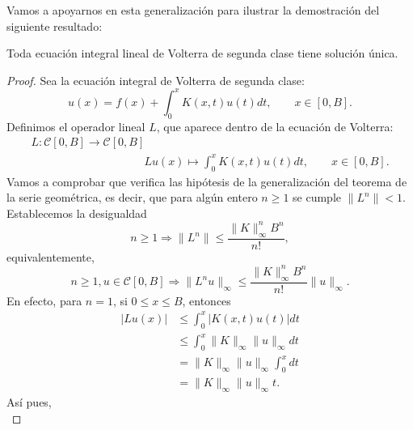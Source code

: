 Vamos a apoyarnos en esta generalización para ilustrar la demostración del siguiente resultado:
\begin{corolario}
	Toda ecuación integral lineal de Volterra de segunda clase tiene solución única.
\end{corolario}
\begin{proof}
	Sea la ecuación integral de Volterra de segunda clase:
	\begin{equation}
		u(x) = f(x) + \int_0^x K(x,t)u(t)dt, \qquad x \in [0,B].
	\end{equation}
	Definimos el operador lineal $L$, que aparece dentro de la ecuación de Volterra:
	\begin{equation}
		\begin{array}{c}
		L: \mathcal{C}[0,B] \rightarrow \mathcal{C}[0,B] \\
		\qquad \qquad \qquad \qquad \qquad Lu(x) \mapsto \displaystyle \int_{0}^{x} K(x,t)u(t)dt, \qquad x \in [0,B].
		\end{array}
	\end{equation}
	Vamos a comprobar que verifica las hipótesis de la generalización del teorema de la serie geométrica, es decir, que para algún entero $n \geqslant 1$ se cumple $\lVert L^n \rVert < 1$.\\
	Establecemos la desigualdad
	\begin{equation}
		n \geqslant 1 \Rightarrow \lVert L^n \rVert \leqslant \dfrac{\lVert K \rVert_\infty^nB^n}{n!},
	\end{equation}
	equivalentemente,
	\begin{equation}
		n \geqslant 1, u \in \mathcal{C}[0,B] \Rightarrow \lVert L^nu \rVert_\infty \leqslant \dfrac{\lVert K \rVert_\infty^nB^n}{n!}\lVert u \rVert_\infty.
	\end{equation}
	En efecto, para $n = 1$, si $0 \leqslant x \leqslant B$, entonces
	\begin{equation}
		\begin{split}
			\lvert Lu(x) \rvert & \leqslant \int_{0}^{x} |K(x,t)u(t)|dt \\
			& \leqslant \int_{0}^{x} \lVert K \rVert_\infty \lVert u \rVert_\infty dt\\
			& = \lVert K \rVert_\infty \lVert u \rVert_\infty \int_{0}^{x}dt\\
			& = \lVert K \rVert_\infty \lVert u \rVert_\infty t.
		\end{split}
	\end{equation}
	Así pues,
	\begin{equation}\label{eq:demvolt1}

\end{equation}
\end{proof}
